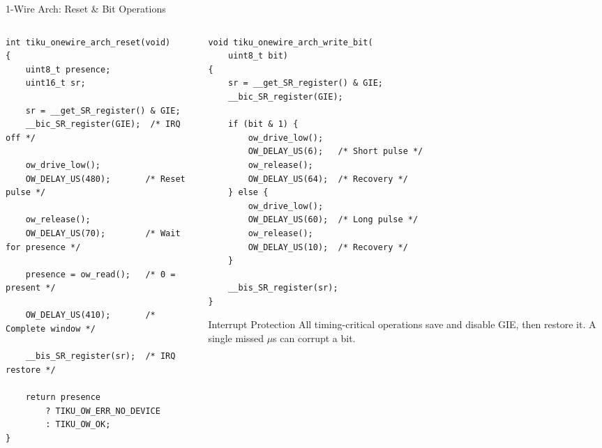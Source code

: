 \documentclass[aspectratio=169, 10pt]{beamer}
\begin{document}
\begin{frame}[fragile]{1-Wire Arch: Reset \& Bit Operations}
\begin{columns}[T]
\begin{column}{0.48\textwidth}
\begin{lstlisting}[style=cstyle, basicstyle=\ttfamily\tiny,
  title={Reset: detect device presence}]
int tiku_onewire_arch_reset(void)
{
    uint8_t presence;
    uint16_t sr;

    sr = __get_SR_register() & GIE;
    __bic_SR_register(GIE);  /* IRQ off */

    ow_drive_low();
    OW_DELAY_US(480);       /* Reset pulse */

    ow_release();
    OW_DELAY_US(70);        /* Wait for presence */

    presence = ow_read();   /* 0 = present */

    OW_DELAY_US(410);       /* Complete window */

    __bis_SR_register(sr);  /* IRQ restore */

    return presence
        ? TIKU_OW_ERR_NO_DEVICE
        : TIKU_OW_OK;
}
\end{lstlisting}
\end{column}

\begin{column}{0.48\textwidth}
\begin{lstlisting}[style=cstyle, basicstyle=\ttfamily\tiny,
  title={Write bit: 1 vs 0 timing}]
void tiku_onewire_arch_write_bit(
    uint8_t bit)
{
    sr = __get_SR_register() & GIE;
    __bic_SR_register(GIE);

    if (bit & 1) {
        ow_drive_low();
        OW_DELAY_US(6);   /* Short pulse */
        ow_release();
        OW_DELAY_US(64);  /* Recovery */
    } else {
        ow_drive_low();
        OW_DELAY_US(60);  /* Long pulse */
        ow_release();
        OW_DELAY_US(10);  /* Recovery */
    }

    __bis_SR_register(sr);
}
\end{lstlisting}

\vspace{0.3em}
\begin{block}{Interrupt Protection}
All timing-critical operations save and
disable GIE, then restore it. A single
missed $\mu$s can corrupt a bit.
\end{block}
\end{column}
\end{columns}
\end{frame}
\end{document}
